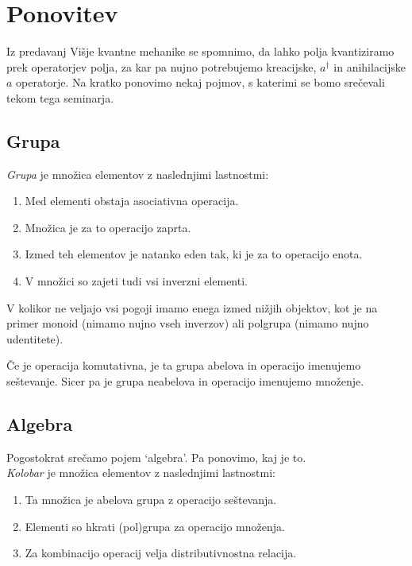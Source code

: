 \section{Ponovitev}

Iz predavanj Vi\v sje kvantne mehanike se spomnimo, da lahko polja
kvantiziramo prek operatorjev polja, za kar pa nujno potrebujemo kreacijske, $a^\dagger$ in 
anihilacijske $a$ operatorje. Na kratko ponovimo nekaj pojmov, s katerimi se bomo sre\v cevali tekom tega
seminarja.

\subsection{Grupa}

\vspace{0.5 cm}

{\em Grupa} je mno\v zica elementov z naslednjimi lastnostmi:

\begin{enumerate}
	\item{Med elementi obstaja asociativna operacija.}
	\item{Mno\v zica je za to operacijo zaprta.}
	\item{Izmed teh elementov je natanko eden tak, ki je za to operacijo enota.}
	\item{V mno\v zici so zajeti tudi vsi inverzni elementi.}
\end{enumerate}

V kolikor ne veljajo vsi pogoji imamo enega izmed ni\v zjih objektov, kot je na primer monoid (nimamo
nujno vseh inverzov) ali polgrupa (nimamo nujno udentitete).

\v Ce je operacija komutativna, je ta grupa abelova in operacijo imenujemo se\v stevanje. Sicer
pa je grupa neabelova in operacijo imenujemo mno\v zenje.

\subsection{Algebra}

\vspace{0.5cm}

Pogostokrat sre\v camo pojem `algebra'. Pa ponovimo, kaj je to.\\

\emph{Kolobar} je mno\v zica elementov z naslednjimi lastnostmi:

\begin{enumerate}
	\item{Ta mno\v zica je abelova grupa z operacijo se\v stevanja.}
	\item{Elementi so hkrati (pol)grupa za operacijo mno\v zenja.}
	\item{Za kombinacijo operacij velja distributivnostna relacija.}
\end{enumerate}

